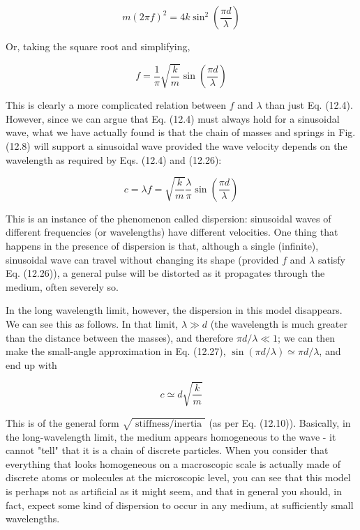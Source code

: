 \documentclass[10pt]{article}
\begin{document}
\begin{equation*}
m(2 \pi f)^{2}=4 k \sin ^{2}\left(\frac{\pi d}{\lambda}\right) \tag{12.25}
\end{equation*}


Or, taking the square root and simplifying,


\begin{equation*}
f=\frac{1}{\pi} \sqrt{\frac{k}{m}} \sin \left(\frac{\pi d}{\lambda}\right) \tag{12.26}
\end{equation*}


This is clearly a more complicated relation between $f$ and $\lambda$ than just Eq. (12.4). However, since we can argue that Eq. (12.4) must always hold for a sinusoidal wave, what we have actually found is that the chain of masses and springs in Fig. (12.8) will support a sinusoidal wave provided the wave velocity depends on the wavelength as required by Eqs. (12.4) and (12.26):


\begin{equation*}
c=\lambda f=\sqrt{\frac{k}{m}} \frac{\lambda}{\pi} \sin \left(\frac{\pi d}{\lambda}\right) \tag{12.27}
\end{equation*}


This is an instance of the phenomenon called dispersion: sinusoidal waves of different frequencies (or wavelengths) have different velocities. One thing that happens in the presence of dispersion is that, although a single (infinite), sinusoidal wave can travel without changing its shape (provided $f$ and $\lambda$ satisfy Eq. (12.26)), a general pulse will be distorted as it propagates through the medium, often severely so.

In the long wavelength limit, however, the dispersion in this model disappears. We can see this as follows. In that limit, $\lambda \gg d$ (the wavelength is much greater than the distance between the masses), and therefore $\pi d / \lambda \ll 1$; we can then make the small-angle approximation in Eq. (12.27), $\sin (\pi d / \lambda) \simeq \pi d / \lambda$, and end up with


\begin{equation*}
c \simeq d \sqrt{\frac{k}{m}} \tag{12.28}
\end{equation*}


This is of the general form $\sqrt{\text { stiffness/inertia }}$ (as per Eq. (12.10)). Basically, in the long-wavelength limit, the medium appears homogeneous to the wave - it cannot "tell" that it is a chain of discrete particles. When you consider that everything that looks homogeneous on a macroscopic scale is actually made of discrete atoms or molecules at the microscopic level, you can see that this model is perhaps not as artificial as it might seem, and that in general you should, in fact, expect some kind of dispersion to occur in any medium, at sufficiently small wavelengths.
\end{document}
